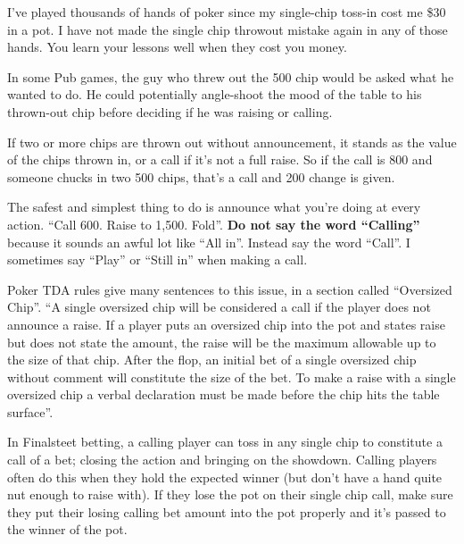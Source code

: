 I've played thousands of hands of poker since my single-chip toss-in
cost me \$30 in a pot. I have not made the single chip throwout mistake 
again in any of those hands. You learn your lessons well when they cost 
you money.

In some Pub games, the guy who threw out the 500 chip would be asked
what he wanted to do. He could potentially angle-shoot the mood
of the table to his thrown-out chip before deciding if he was
raising or calling.

If two or more chips are thrown out without announcement, it stands
as the value of the chips thrown in, or a call if it's not a full
raise. So if the call is 800 and someone chucks in two 500 chips,
that's a call and 200 change is given.

The safest and simplest thing to do is announce what you're doing
at every action. ``Call 600. Raise to 1,500. Fold''. \textbf{Do not
say the word ``Calling''} because it sounds an awful lot like ``All
in''. Instead say the word ``Call''. I sometimes say ``Play'' or
``Still in'' when making a call.

Poker TDA rules give many sentences to this issue, in a section
called ``Oversized Chip''. ``A single oversized chip will be considered
a call if the player does not announce a raise. If a player puts an
oversized chip into the pot and states raise but does not state the
amount, the raise will be the maximum allowable up to the size of that
chip. After the flop, an initial bet of a single oversized chip
without comment will constitute the size of the bet. To make a raise
with a single oversized chip a verbal declaration must be made
before the chip hits the table surface''.

In Finalsteet betting, a calling player can toss in any single chip to
constitute a call of a bet; closing the action and bringing on the
showdown. Calling players often do this when they hold the expected
winner (but don't have a hand quite nut enough to raise with). If they
lose the pot on their single chip call, make sure they put their
losing calling bet amount into the pot properly and it's passed to the
winner of the pot.



